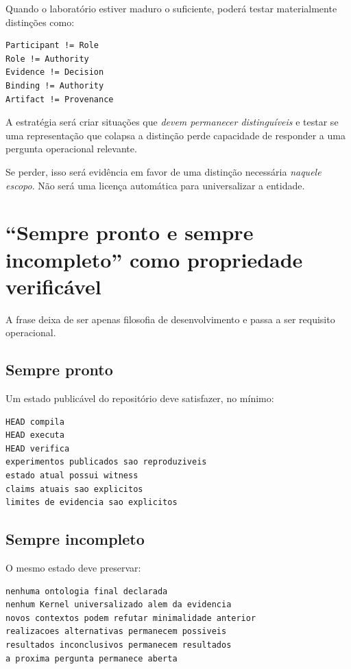 \documentclass[11pt,a4paper]{article}
\begin{document}
Quando o laboratório estiver maduro o suficiente, poderá testar materialmente
distinções como:

\begin{lstlisting}
Participant != Role
Role != Authority
Evidence != Decision
Binding != Authority
Artifact != Provenance
\end{lstlisting}

A estratégia será criar situações que \emph{devem permanecer distinguíveis} e testar
se uma representação que colapsa a distinção perde capacidade de responder a uma
pergunta operacional relevante.

Se perder, isso será evidência em favor de uma distinção necessária \emph{naquele
escopo}. Não será uma licença automática para universalizar a entidade.

\section{“Sempre pronto e sempre incompleto” como propriedade verificável}

A frase deixa de ser apenas filosofia de desenvolvimento e passa a ser requisito
operacional.

\subsection{Sempre pronto}

Um estado publicável do repositório deve satisfazer, no mínimo:

\begin{lstlisting}
HEAD compila
HEAD executa
HEAD verifica
experimentos publicados sao reproduziveis
estado atual possui witness
claims atuais sao explicitos
limites de evidencia sao explicitos
\end{lstlisting}

\subsection{Sempre incompleto}

O mesmo estado deve preservar:

\begin{lstlisting}
nenhuma ontologia final declarada
nenhum Kernel universalizado alem da evidencia
novos contextos podem refutar minimalidade anterior
realizacoes alternativas permanecem possiveis
resultados inconclusivos permanecem resultados
a proxima pergunta permanece aberta
\end{lstlisting}
\end{document}

